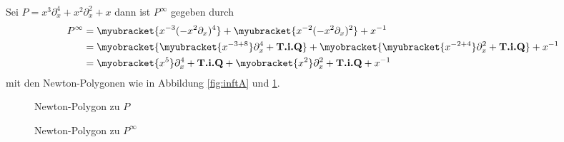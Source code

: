\begin{exmp}
Sei $P=x^3\partial_x^4+x^2\partial_x^2+x$ dann ist $P^\infty$ gegeben durch
\begin{align*}
P^\infty&=\myubracket{x^{-3}(-x^2\partial_x)^4}
  +\myubracket{x^{-2}(-x^2\partial_x)^2}+x^{-1}
\\&=\myobracket{\myubracket{x^{-3+8}}\partial_x^4+\textbf{T.i.Q}}
  +\myobracket{\myubracket{x^{-2+4}}\partial_x^2+\textbf{T.i.Q}} +x^{-1}
\\&=\myobracket{x^{5}}\partial_x^4+\textbf{T.i.Q}
  +\myobracket{x^{2}}\partial_x^2+\textbf{T.i.Q} +x^{-1}
\end{align*}
mit den Newton-Polygonen wie in Abbildung \ref{fig:inftA} und
\ref{fig:inftB}.
\begin{figure}[htbp]
  \begin{minipage}[hbt]{0,49\textwidth}
  \begin{center}
  \end{center}
  \caption{Newton-Polygon zu $P$}
    \label{fig:inftA}
  \end{minipage}
  \begin{minipage}[hbt]{0,49\textwidth}
  \begin{center}
  \end{center}
  \caption{Newton-Polygon zu $P^\infty$}
    \label{fig:inftB}
  \end{minipage}
\end{figure}
\end{exmp}

